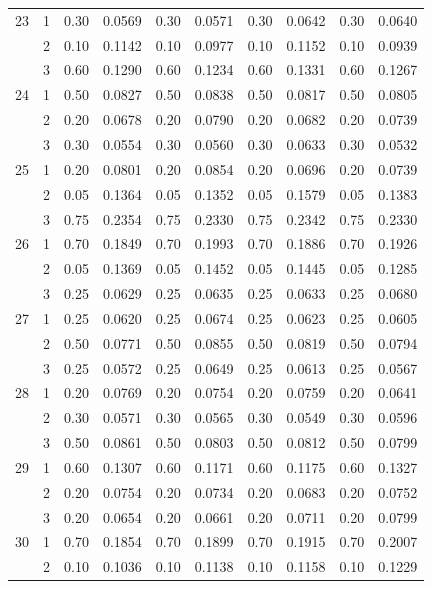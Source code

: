 \begin{longtable}{llcccccccc}
  23 & 1 & 0.30 & 0.0569 & 0.30 & 0.0571 & 0.30 & 0.0642 & 0.30 & 0.0640 \\ 
   & 2 & 0.10 & 0.1142 & 0.10 & 0.0977 & 0.10 & 0.1152 & 0.10 & 0.0939 \\ 
   & 3 & 0.60 & 0.1290 & 0.60 & 0.1234 & 0.60 & 0.1331 & 0.60 & 0.1267 \\ 
  24 & 1 & 0.50 & 0.0827 & 0.50 & 0.0838 & 0.50 & 0.0817 & 0.50 & 0.0805 \\ 
   & 2 & 0.20 & 0.0678 & 0.20 & 0.0790 & 0.20 & 0.0682 & 0.20 & 0.0739 \\ 
   & 3 & 0.30 & 0.0554 & 0.30 & 0.0560 & 0.30 & 0.0633 & 0.30 & 0.0532 \\ 
  25 & 1 & 0.20 & 0.0801 & 0.20 & 0.0854 & 0.20 & 0.0696 & 0.20 & 0.0739 \\ 
   & 2 & 0.05 & 0.1364 & 0.05 & 0.1352 & 0.05 & 0.1579 & 0.05 & 0.1383 \\ 
   & 3 & 0.75 & 0.2354 & 0.75 & 0.2330 & 0.75 & 0.2342 & 0.75 & 0.2330 \\ 
  26 & 1 & 0.70 & 0.1849 & 0.70 & 0.1993 & 0.70 & 0.1886 & 0.70 & 0.1926 \\ 
   & 2 & 0.05 & 0.1369 & 0.05 & 0.1452 & 0.05 & 0.1445 & 0.05 & 0.1285 \\ 
   & 3 & 0.25 & 0.0629 & 0.25 & 0.0635 & 0.25 & 0.0633 & 0.25 & 0.0680 \\ 
  27 & 1 & 0.25 & 0.0620 & 0.25 & 0.0674 & 0.25 & 0.0623 & 0.25 & 0.0605 \\ 
   & 2 & 0.50 & 0.0771 & 0.50 & 0.0855 & 0.50 & 0.0819 & 0.50 & 0.0794 \\ 
   & 3 & 0.25 & 0.0572 & 0.25 & 0.0649 & 0.25 & 0.0613 & 0.25 & 0.0567 \\ 
  28 & 1 & 0.20 & 0.0769 & 0.20 & 0.0754 & 0.20 & 0.0759 & 0.20 & 0.0641 \\ 
   & 2 & 0.30 & 0.0571 & 0.30 & 0.0565 & 0.30 & 0.0549 & 0.30 & 0.0596 \\ 
   & 3 & 0.50 & 0.0861 & 0.50 & 0.0803 & 0.50 & 0.0812 & 0.50 & 0.0799 \\ 
  29 & 1 & 0.60 & 0.1307 & 0.60 & 0.1171 & 0.60 & 0.1175 & 0.60 & 0.1327 \\ 
   & 2 & 0.20 & 0.0754 & 0.20 & 0.0734 & 0.20 & 0.0683 & 0.20 & 0.0752 \\ 
   & 3 & 0.20 & 0.0654 & 0.20 & 0.0661 & 0.20 & 0.0711 & 0.20 & 0.0799 \\ 
  30 & 1 & 0.70 & 0.1854 & 0.70 & 0.1899 & 0.70 & 0.1915 & 0.70 & 0.2007 \\ 
   & 2 & 0.10 & 0.1036 & 0.10 & 0.1138 & 0.10 & 0.1158 & 0.10 & 0.1229 \\ 

\end{longtable}
